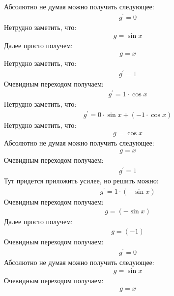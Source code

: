 \documentclass[12pt,a4paper]{scrartcl}
\begin{document}
Абсолютно не думая можно получить следующее:
\begin{gather}\label{eq:f2a57500}g^\prime  = 0\end{gather}
Нетрудно заметить, что:
\begin{gather}\label{eq:f2a57470}g  =  \sin{ x } \end{gather}
Далее просто получем:
\begin{gather}\label{eq:f2a574a0}g  = x\end{gather}
Нетрудно заметить, что:
\begin{gather}\label{eq:f2a57680}g^\prime  = 1\end{gather}
Очевидным переходом получаем:
\begin{gather}\label{eq:f2a57650}g^\prime  = 1 \cdot  \cos{ x } \end{gather}
Нетрудно заметить, что:
\begin{gather}\label{eq:f2a57260}g^\prime  = 0 \cdot  \sin{ x }  +  \left(-1 \cdot  \cos{ x } \right) \end{gather}
Нетрудно заметить, что:
\begin{gather}\label{eq:f2a57680}g  =  \cos{ x } \end{gather}
Абсолютно не думая можно получить следующее:
\begin{gather}\label{eq:f2a574d0}g  = x\end{gather}
Очевидным переходом получаем:
\begin{gather}\label{eq:f2a577d0}g^\prime  = 1\end{gather}
Тут придется приложить усилее, но решить можно:
\begin{gather}\label{eq:f2a577a0}g^\prime  = 1 \cdot  \left(- \sin{ x } \right) \end{gather}
Очевидным переходом получаем:
\begin{gather}\label{eq:f2a574d0}g  =  \left(- \sin{ x } \right) \end{gather}
Далее просто получем:
\begin{gather}\label{eq:f2a577d0}g  = \left(-1\right)\end{gather}
Очевидным переходом получаем:
\begin{gather}\label{eq:f2a57890}g^\prime  = 0\end{gather}
Абсолютно не думая можно получить следующее:
\begin{gather}\label{eq:f2a57800}g  =  \sin{ x } \end{gather}
Очевидным переходом получаем:
\begin{gather}\label{eq:f2a57830}g  = x\end{gather}
\end{document}
